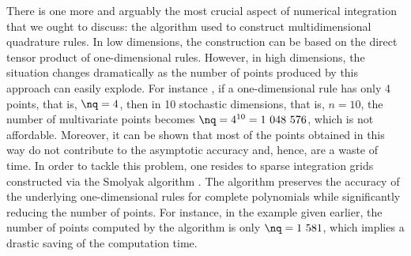 There is one more and arguably the most crucial aspect of numerical integration
that we ought to discuss: the algorithm used to construct multidimensional
quadrature rules. In low dimensions, the construction can be based on the direct
tensor product of one-dimensional rules. However, in high dimensions, the
situation changes dramatically as the number of points produced by this approach
can easily explode. For instance \cite{heiss2008}, if a one-dimensional rule has
only 4 points, that is, $\nq = 4$, then in 10 stochastic dimensions, that is, $n
= 10$, the number of multivariate points becomes $\nq = 4^{10} = 1~048~576$,
which is not affordable. Moreover, it can be shown that most of the points
obtained in this way do not contribute to the asymptotic accuracy and, hence,
are a waste of time. In order to tackle this problem, one resides to sparse
integration grids constructed via the Smolyak algorithm \cite{burkardt,
eldred2008, heiss2008}. The algorithm preserves the accuracy of the underlying
one-dimensional rules for complete polynomials while significantly reducing the
number of points. For instance, in the example given earlier, the number of
points computed by the algorithm is only $\nq = 1~581$, which implies a drastic
saving of the computation time.
